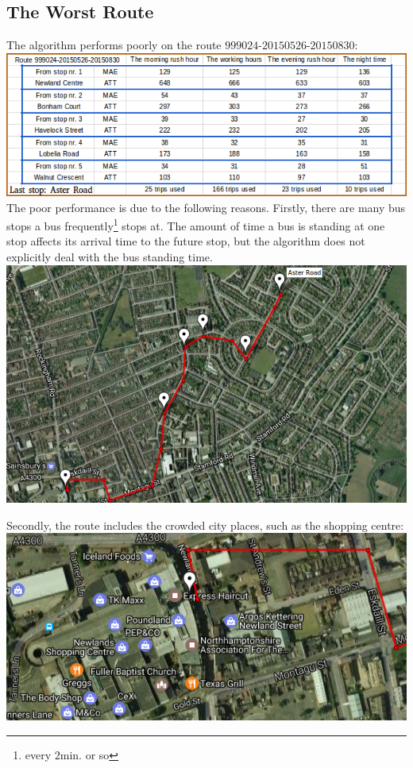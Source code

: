 \documentclass[12pt,a4paper,oneside,openright]{report}
\begin{document}
\subsection{The Worst Route}

The algorithm performs poorly on the route $999024$-$20150526$-$20150830$: \\

\includegraphics[width=\textwidth]{figs/table_of_999024.png} \\

The poor performance is due to the following reasons. Firstly, there are many bus stops a bus
frequently\footnote{every $2$min. or so} stops at. The amount of time a bus is standing at one
stop affects its arrival time to the future stop, but the algorithm does not explicitly deal with
the bus standing time. \\

\includegraphics[scale=0.8]{figs/worst_route.png} \\

\newpage

Secondly, the route includes the crowded city places, such as the shopping centre: \\

\includegraphics[scale=0.6]{figs/shopping_centre.png} \\
\end{document}
